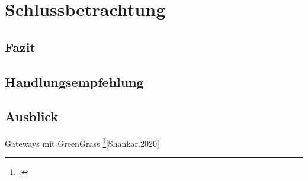 \chapter{Schlussbetrachtung}

\section{Fazit}

\section{Handlungsempfehlung}

\section{Ausblick}

Gateways mit GreenGrass \footcite{}{}[Shankar.2020]